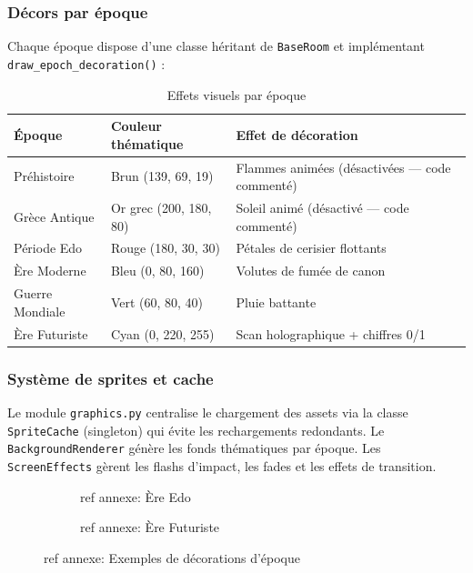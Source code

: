 \documentclass[12pt,a4paper]{article}
\begin{document}
\subsubsection*{Décors par époque}

Chaque époque dispose d'une classe héritant de \texttt{BaseRoom} et implémentant \texttt{draw\_epoch\_decoration()} :

\begin{table}[H]
\centering
\caption{Effets visuels par époque}
\renewcommand{\arraystretch}{1.35}
\begin{tabular}{@{}lll@{}}
\toprule
\rowcolor{tableheadbg}
\textbf{Époque} & \textbf{Couleur thématique} & \textbf{Effet de décoration} \\
\midrule
Préhistoire      & Brun (139, 69, 19)      & Flammes animées (désactivées — code commenté) \\
\rowcolor{rowaltbg}
Grèce Antique    & Or grec (200, 180, 80)  & Soleil animé (désactivé — code commenté) \\
Période Edo      & Rouge (180, 30, 30)     & Pétales de cerisier flottants \\
\rowcolor{rowaltbg}
Ère Moderne      & Bleu (0, 80, 160)       & Volutes de fumée de canon \\
Guerre Mondiale  & Vert (60, 80, 40)       & Pluie battante \\
\rowcolor{rowaltbg}
Ère Futuriste    & Cyan (0, 220, 255)      & Scan holographique + chiffres 0/1 \\
\bottomrule
\end{tabular}
\end{table}

\subsubsection*{Système de sprites et cache}

Le module \texttt{graphics.py} centralise le chargement des assets via la classe \texttt{SpriteCache} (singleton) qui évite les rechargements redondants. Le \texttt{BackgroundRenderer} génère les fonds thématiques par époque. Les \texttt{ScreenEffects} gèrent les flashs d'impact, les fades et les effets de transition.

\begin{figure}[H]
  \centering
  \begin{subfigure}[b]{0.47\textwidth}
    \caption{ref annexe: Ère Edo}
  \end{subfigure}
  \hfill
  \begin{subfigure}[b]{0.47\textwidth}
    \caption{ref annexe: Ère Futuriste}
  \end{subfigure}
  \caption{ref annexe: Exemples de décorations d'époque}
\end{figure}
\end{document}
